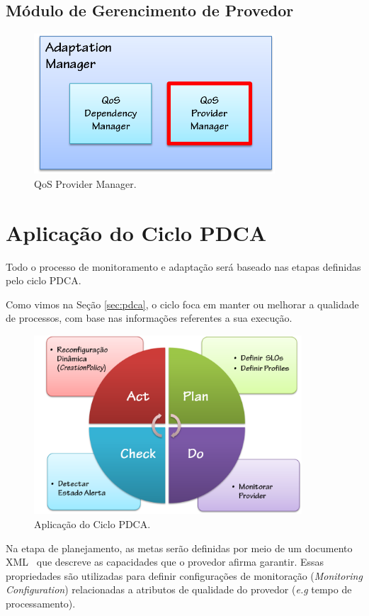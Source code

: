 \subsection{Módulo de Gerencimento de Provedor}

\begin{figure}[htp]
\centering
\includegraphics[width=9cm]{chapters/chapter4/adaptation-manager.png}
\caption[QoS Provider Manager]{QoS Provider Manager.}
\label{fig:proposal}
\end{figure}


\section{Aplicação do Ciclo PDCA}
Todo o processo de monitoramento e adaptação será baseado nas etapas definidas pelo ciclo PDCA.

Como vimos na Seção \ref{sec:pdca}, o ciclo foca em manter ou melhorar a qualidade de processos, com base nas informações referentes a sua execução.

\begin{figure}[htp]
\centering
\includegraphics[width=10cm]{chapters/chapter4/pdca_actions.png}
\caption[Aplicação do Ciclo PDCA]{Aplicação do Ciclo PDCA.}
\label{fig:pdcamapping}
\end{figure}


Na etapa de planejamento, as metas serão definidas por meio de um documento XML~\cite{xml} que descreve as capacidades que o provedor afirma garantir. Essas propriedades são utilizadas para definir configurações de monitoração (\textit{Monitoring Configuration}) relacionadas a atributos de qualidade do provedor (\textit{e.g} tempo de processamento).

